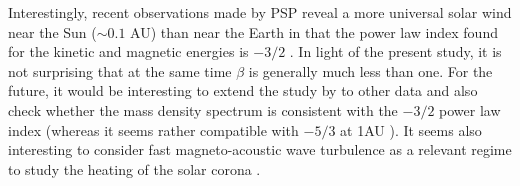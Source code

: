 \documentclass{jpp}
\begin{document}
Interestingly, recent observations made by PSP reveal a more universal solar wind near the Sun ($\sim 0.1$ AU) than near the Earth in that the power law index found for the kinetic and magnetic energies is $-3/2$ \citep{Chen2020,Shi2021,Zhao2022}. In light of the present study, it is not surprising that at the same time $\beta$ is generally much less than one. For the future, it would be interesting to extend the study by \cite{Zhao2022b} to other data and also check whether the mass density spectrum is consistent with the $-3/2$ power law index \citep{Moncuquet2020,Zank2022} (whereas it seems rather compatible with $-5/3$ at 1AU \citep{Montgomery1987,Coles1989,Hnat2005}). 
It seems also interesting to consider fast magneto-acoustic wave turbulence as a relevant regime to study the heating of the solar corona 
\citep{Galtier1998,Chandran2005}. 








\end{document}
